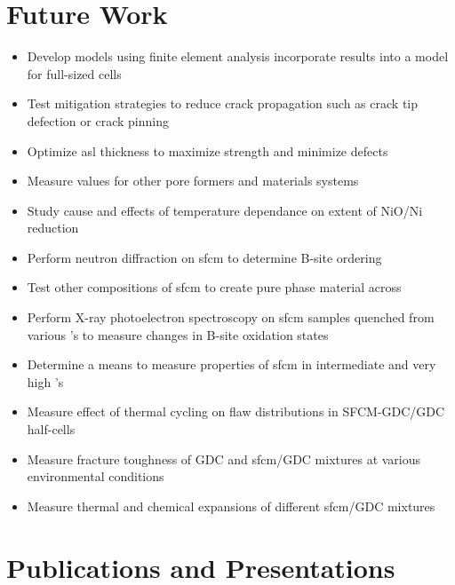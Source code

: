\section{Future Work}
\begin{itemize}
    \item Develop models using finite element analysis incorporate results into a model for full-sized cells
    \item Test mitigation strategies to reduce crack propagation such as crack tip defection or crack pinning
    \item Optimize \gls{asl} thickness to maximize strength and minimize defects
    \item Measure \texteta{} values for other pore formers and materials systems
    \item Study cause and effects of temperature dependance on extent of NiO/Ni reduction
    \item Perform neutron diffraction on \gls{sfcm} to determine B-site ordering
    \item Test other compositions of \gls{sfcm} to create pure phase material across 
    \item Perform X-ray photoelectron spectroscopy on \gls{sfcm} samples quenched from various 's to measure changes in B-site oxidation states
    \item Determine a means to measure properties of \gls{sfcm} in intermediate and very high 's
    \item Measure effect of thermal cycling on flaw distributions in SFCM-GDC/GDC half-cells
    \item Measure fracture toughness of GDC and \gls{sfcm}/GDC mixtures at various environmental conditions
    \item Measure thermal and chemical expansions of different \gls{sfcm}/GDC mixtures
\end{itemize}

\section{Publications and Presentations}
